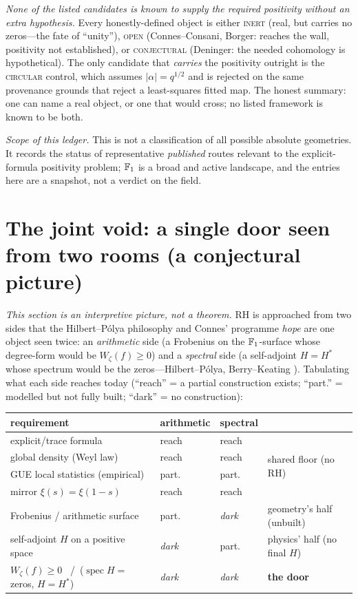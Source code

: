 \documentclass[11pt]{article}
\begin{document}
\noindent \emph{None of the listed candidates is known to supply the required
positivity without an extra hypothesis.} Every honestly-defined object is either
\textsc{inert} (real, but carries no zeros---the fate of ``unity''), \textsc{open}
(Connes--Consani, Borger: reaches the wall, positivity not established), or
\textsc{conjectural} (Deninger: the needed cohomology is hypothetical). The only
candidate that \emph{carries} the positivity outright is the \textsc{circular} control,
which assumes $|\alpha|=q^{1/2}$ and is rejected on the same provenance grounds that
reject a least-squares fitted map. The honest summary: one can name a real object, or
one that would cross; no listed framework is known to be both.

\smallskip\noindent\emph{Scope of this ledger.} This is not a classification of all
possible absolute geometries. It records the status of representative \emph{published}
routes relevant to the explicit-formula positivity problem; $\mathbb{F}_1$ is a broad and active
landscape, and the entries here are a snapshot, not a verdict on the field.

\section{The joint void: a single door seen from two rooms (a conjectural picture)}
\emph{This section is an interpretive picture, not a theorem.} RH is approached from two
sides that the Hilbert--P\'olya philosophy and Connes' programme \emph{hope} are one
object seen twice: an \emph{arithmetic} side (a Frobenius on the $\mathbb{F}_1$-surface whose
degree-form would be $W_\zeta(f)\ge 0$) and a \emph{spectral} side (a self-adjoint $H=H^*$
whose spectrum would be the zeros---Hilbert--P\'olya, Berry--Keating \cite{BerryKeating}).
Tabulating what each side reaches today (``reach'' = a partial construction exists;
``part.'' = modelled but not fully built; ``dark'' = no construction):

\begin{center}\small
\begin{tabular}{llll}
\hline
requirement & arithmetic & spectral & \\
\hline
explicit/trace formula & reach & reach & \multirow{4}{*}{\small shared floor (no RH)}\\
global density (Weyl law) & reach & reach & \\
GUE local statistics (empirical) & part. & part. & \\
mirror $\xi(s)=\xi(1-s)$ & reach & reach & \\
\hline
Frobenius / arithmetic surface & part. & \emph{dark} & geometry's half (unbuilt) \\
self-adjoint $H$ on a positive space & \emph{dark} & part. & physics' half (no final $H$) \\
\hline
$W_\zeta(f)\ge0$ \ /\ ($\operatorname{spec} H=$ zeros, $H=H^*$) & \emph{dark} & \emph{dark} & \textbf{the door} \\
\hline
\end{tabular}
\end{center}
\end{document}

